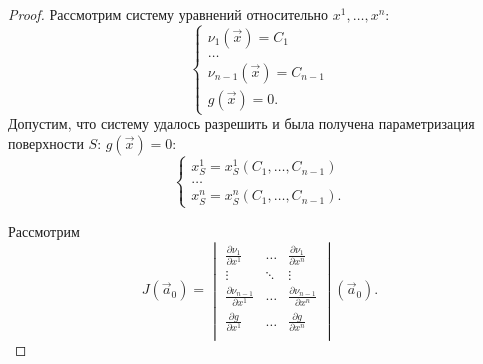 \begin{proof}
    Рассмотрим систему уравнений относительно $x^1, \dots, x^n$:
    \begin{equation}
    	\begin{cases}
    		\nu_1 \left( \vec{x} \right) = C_1             \\
    		\dots                                                     \\
    		\nu_{n - 1} \left( \vec{x} \right) = C_{n - 1} \\
    		g \left( \vec{x} \right) = 0.
    	\end{cases}
    	\label{part_eq_5}
    \end{equation}
    Допустим, что систему удалось разрешить и была получена параметризация поверхности $S$: $g \left( \vec{x} \right) = 0$:
    \begin{equation*}
    	\begin{cases}
    		x^1_S = x^1_S \left( C_1, \dots, C_{n - 1} \right) \\
    		\dots                                              \\
    		x^n_S = x^n_S \left( C_1, \dots, C_{n - 1} \right).
    	\end{cases}
    \end{equation*}

    Рассмотрим
    \begin{equation*}
    	J \left( \vec{a}_0 \right) =
    	\begin{vmatrix}
    		\displaystyle \frac{\partial \nu_1}{\partial x^1} & \dots & \displaystyle \frac{\partial \nu_1}{\partial x^n}             \\
    		\vdots & \ddots & \vdots                                                                                          \\
    		\displaystyle \frac{\partial \nu_{n - 1}}{\partial x^1} & \dots & \displaystyle \frac{\partial \nu_{n - 1}}{\partial x^n} \\
    		\displaystyle \frac{\partial g}{\partial x^1} & \dots & \displaystyle \frac{\partial g}{\partial x^n}                     \\
    	\end{vmatrix}  \left( \vec{a}_0 \right).
    \end{equation*}
    

\end{proof}
